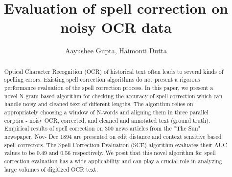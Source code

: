 \documentclass[preprint,11pt]{elsarticle}
\begin{document}
\begin{frontmatter}



\title{Evaluation of spell correction on noisy OCR data}


\author{Aayushee Gupta, Haimonti Dutta}

\address{}



\begin{abstract}
Optical Character Recognition (OCR) of historical text often leads to several kinds of spelling errors. Existing spell correction algorithms do not present a rigorous performance evaluation of the spell correction process. In this paper, we present a novel N-gram based algorithm for checking the accuracy of spell correction which can handle noisy and cleaned text of different lengths.
The algorithm relies on appropriately choosing a window of N-words and aligning them in three parallel corpora - noisy OCR, corrected, and cleaned and annotated text (ground truth). Empirical results of spell correction on 300 news articles from the ``The Sun" newspaper, Nov- Dec 1894 are presented on edit distance and context sensitive based spell correctors. The Spell Correction Evaluation (SCE) algorithm evaluates their AUC values to be 0.49 and 0.56 respectively. We posit that this novel algorithm for spell correction evaluation has a wide applicability and can play a crucial role in analyzing large volumes of digitized OCR text.


\end{abstract}
\end{frontmatter}
\end{document}
